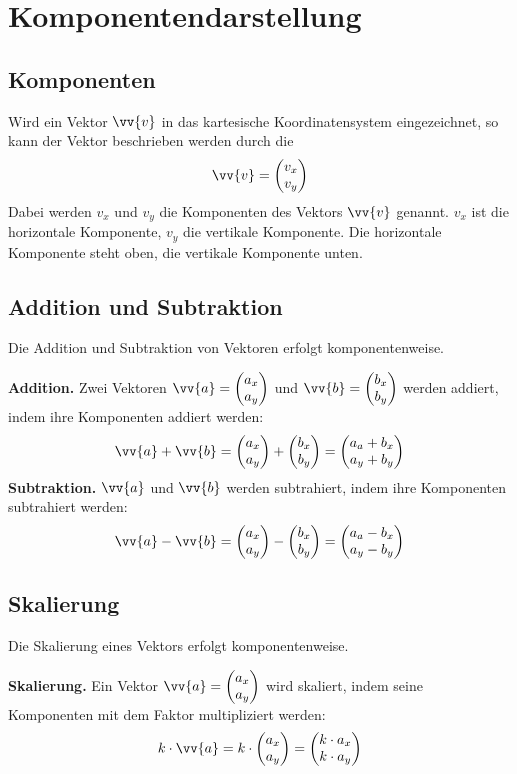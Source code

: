 \newpage
\section{Komponentendarstellung}

\subsection{Komponenten}

Wird ein Vektor $\vv{v}$ in das kartesische Koordinatensystem eingezeichnet, so kann der Vektor beschrieben werden durch die
\[
  \vv{v} = \vxy{v_{x}}{v_{y}}
\]
Dabei werden $v_{x}$ und $v_{y}$ die Komponenten des Vektors $\vv{v}$ genannt. $v_{x}$ ist die horizontale Komponente, $v_{y}$ die vertikale Komponente. Die horizontale Komponente steht oben, die vertikale Komponente unten.

\subsection{Addition und Subtraktion}
Die Addition und Subtraktion von Vektoren erfolgt komponentenweise.

\begin{theorem}
  \textbf{Addition.} Zwei Vektoren $\vv{a} = \vxy{a_{x}}{a_{y}}$ und $\vv{b} = \vxy{b_{x}}{b_{y}}$ werden addiert, indem ihre Komponenten addiert werden:
  \[
    \vv{a}+\vv{b} = \vxy{a_{x}}{a_{y}}+\vxy{b_{x}}{b_{y}} = \vxy{a_{a}+b_{x}}{a_{y}+b_{y}}
  \]
  \textbf{Subtraktion.} $\vv{a}$ und $\vv{b}$ werden subtrahiert, indem ihre Komponenten subtrahiert werden:
  \[
    \vv{a}-\vv{b} = \vxy{a_{x}}{a_{y}}-\vxy{b_{x}}{b_{y}} = \vxy{a_{a}-b_{x}}{a_{y}-b_{y}}
  \]

\end{theorem}

\subsection{Skalierung}

Die Skalierung eines Vektors erfolgt komponentenweise.

\begin{theorem}
  \textbf{Skalierung.} Ein Vektor  $\vv{a} = \vxy{a_{x}}{a_{y}}$ wird skaliert, indem seine Komponenten mit dem Faktor multipliziert werden:
  \[
    k\cdot\vv{a} = k\cdot\vxy{a_{x}}{a_{y}} = \vxy{k\cdot a_{x}}{k\cdot a_{y}}
  \]
\end{theorem}

